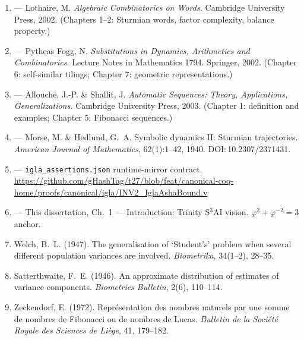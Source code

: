 \begin{enumerate}
  \item \cite{lothaire2002algebraic} --- Lothaire, M.
    \emph{Algebraic Combinatorics on Words.}
    Cambridge University Press, 2002.  (Chapters 1--2: Sturmian words,
    factor complexity, balance property.)

  \item \cite{pytheasfogg2002substitutions} --- Pytheas Fogg, N.
    \emph{Substitutions in Dynamics, Arithmetics and Combinatorics.}
    Lecture Notes in Mathematics 1794.  Springer, 2002.
    (Chapter 6: self-similar tilings; Chapter 7: geometric representations.)

  \item \cite{allouche2003automatic} --- Allouche, J.-P. \& Shallit, J.
    \emph{Automatic Sequences: Theory, Applications, Generalizations.}
    Cambridge University Press, 2003.
    (Chapter 1: definition and examples; Chapter 5: Fibonacci sequences.)

  \item \cite{morse1940symbolic} --- Morse, M. \& Hedlund, G.~A.
    Symbolic dynamics II: Sturmian trajectories.
    \emph{American Journal of Mathematics}, 62(1):1--42, 1940.
    DOI:\,10.2307/2371431.

  \item \cite{t27spec} ---
    \texttt{igla\_assertions.json} runtime-mirror contract.
    \url{https://github.com/gHashTag/t27/blob/feat/canonical-coq-home/proofs/canonical/igla/INV2_IglaAshaBound.v}

  \item \cite{trinity_brain} --- This dissertation, Ch.~1 ---
    Introduction: Trinity S\(^3\)AI vision.
    \(\varphi^2 + \varphi^{-2} = 3\) anchor.

  \item Welch, B.~L. (1947). The generalisation of `Student's'
    problem when several different population variances are involved.
    \emph{Biometrika}, 34(1--2), 28--35.

  \item Satterthwaite, F.~E. (1946). An approximate distribution of
    estimates of variance components.
    \emph{Biometrics Bulletin}, 2(6), 110--114.

  \item Zeckendorf, E. (1972). Repr\'{e}sentation des nombres naturels
    par une somme de nombres de Fibonacci ou de nombres de Lucas.
    \emph{Bulletin de la Soci\'{e}t\'{e} Royale des Sciences de Li\`{e}ge},
    41, 179--182.


\end{enumerate}
